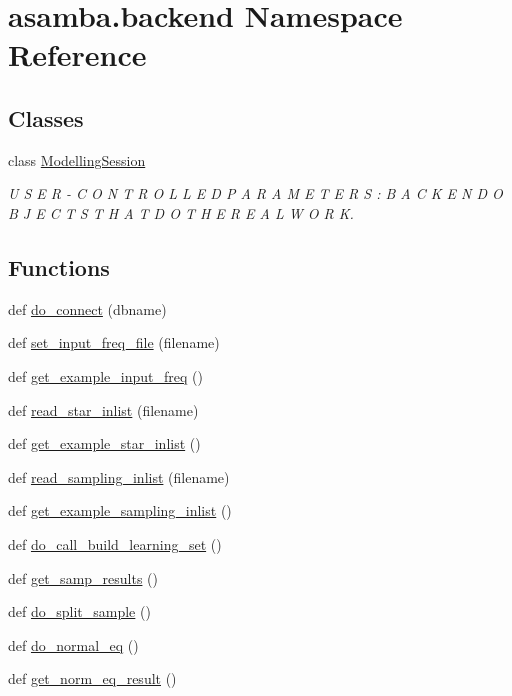 \hypertarget{namespaceasamba_1_1backend}{}\section{asamba.\+backend Namespace Reference}
\label{namespaceasamba_1_1backend}
\subsection*{Classes}
\begin{DoxyCompactItemize}
\item 
class \hyperlink{classasamba_1_1backend_1_1_modelling_session}{Modelling\+Session}
\begin{DoxyCompactList}\small\item\em U S E R -\/ C O N T R O L L E D P A R A M E T E R S \+: B A C K E N D O B J E C T S T H A T D O T H E R E A L W O R K. \end{DoxyCompactList}\end{DoxyCompactItemize}
\subsection*{Functions}
\begin{DoxyCompactItemize}
\item 
def \hyperlink{namespaceasamba_1_1backend_aefeca01f2d6cfbd7f78c26901d48b37f}{do\+\_\+connect} (dbname)
\item 
def \hyperlink{namespaceasamba_1_1backend_a6312398e26ae20a0e2ca43fb80866328}{set\+\_\+input\+\_\+freq\+\_\+file} (filename)
\item 
def \hyperlink{namespaceasamba_1_1backend_a5cc5719b5de5aadd02843c5746a10313}{get\+\_\+example\+\_\+input\+\_\+freq} ()
\item 
def \hyperlink{namespaceasamba_1_1backend_a4f5499ca7e69d4d088309b1f6a3e14b8}{read\+\_\+star\+\_\+inlist} (filename)
\item 
def \hyperlink{namespaceasamba_1_1backend_a5df45c487576d585748d45f92a587ad9}{get\+\_\+example\+\_\+star\+\_\+inlist} ()
\item 
def \hyperlink{namespaceasamba_1_1backend_a0f88980e600c7c4bbf21efb7274dae9a}{read\+\_\+sampling\+\_\+inlist} (filename)
\item 
def \hyperlink{namespaceasamba_1_1backend_a29100d2ee6f88a4ca3bf2f7dff20f715}{get\+\_\+example\+\_\+sampling\+\_\+inlist} ()
\item 
def \hyperlink{namespaceasamba_1_1backend_a46038cbb0a9dd4320c0357f78b392076}{do\+\_\+call\+\_\+build\+\_\+learning\+\_\+set} ()
\item 
def \hyperlink{namespaceasamba_1_1backend_a6d6a812ce0d681b4deb0768cb9b2df69}{get\+\_\+samp\+\_\+results} ()
\item 
def \hyperlink{namespaceasamba_1_1backend_a7991be555fc395ba6753a5d18976c0f0}{do\+\_\+split\+\_\+sample} ()
\item 
def \hyperlink{namespaceasamba_1_1backend_aae574ec8e5b56784a17eac85f49b9ff6}{do\+\_\+normal\+\_\+eq} ()
\item 
def \hyperlink{namespaceasamba_1_1backend_a0632807c78a1c7393f0c6295de7130f0}{get\+\_\+norm\+\_\+eq\+\_\+result} ()
\end{DoxyCompactItemize}
